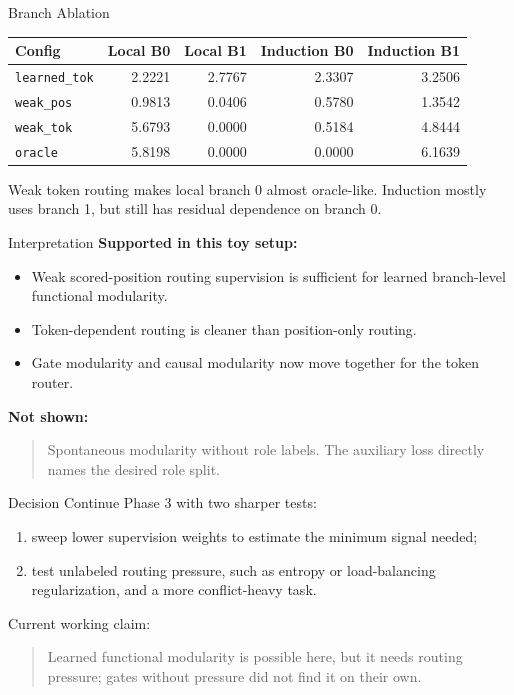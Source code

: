 \documentclass[aspectratio=169]{beamer}
\begin{document}
\begin{frame}{Branch Ablation}
  \begin{center}
  \scriptsize
  \begin{tabular}{lrrrr}
    \toprule
    Config & Local B0 & Local B1 & Induction B0 & Induction B1 \\
    \midrule
    \texttt{learned\_tok} & 2.2221 & 2.7767 & 2.3307 & 3.2506 \\
    \texttt{weak\_pos} & 0.9813 & 0.0406 & 0.5780 & 1.3542 \\
    \texttt{weak\_tok} & 5.6793 & 0.0000 & 0.5184 & 4.8444 \\
    \texttt{oracle} & 5.8198 & 0.0000 & 0.0000 & 6.1639 \\
    \bottomrule
  \end{tabular}
  \end{center}

  \vspace{0.7em}
  Weak token routing makes local branch 0 almost oracle-like. Induction mostly
  uses branch 1, but still has residual dependence on branch 0.
\end{frame}

\begin{frame}{Interpretation}
  \textbf{Supported in this toy setup:}
  \begin{itemize}
    \item Weak scored-position routing supervision is sufficient for learned
      branch-level functional modularity.
    \item Token-dependent routing is cleaner than position-only routing.
    \item Gate modularity and causal modularity now move together for the token router.
  \end{itemize}

  \vspace{0.6em}
  \textbf{Not shown:}
  \begin{quote}
    Spontaneous modularity without role labels. The auxiliary loss directly names
    the desired role split.
  \end{quote}
\end{frame}

\begin{frame}{Decision}
  Continue Phase 3 with two sharper tests:

  \begin{enumerate}
    \item sweep lower supervision weights to estimate the minimum signal needed;
    \item test unlabeled routing pressure, such as entropy or load-balancing
      regularization, and a more conflict-heavy task.
  \end{enumerate}

  \vspace{0.8em}
  Current working claim:
  \begin{quote}
    Learned functional modularity is possible here, but it needs routing pressure;
    gates without pressure did not find it on their own.
  \end{quote}
\end{frame}
\end{document}
